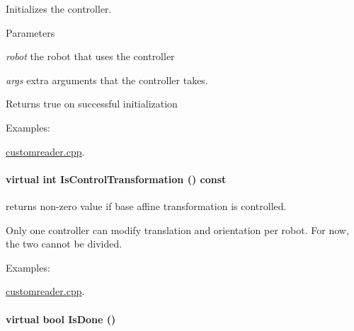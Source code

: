 Initializes the controller. 


\begin{DoxyParams}{Parameters}
\item[{\em robot}]the robot that uses the controller \item[{\em args}]extra arguments that the controller takes. \end{DoxyParams}
\begin{DoxyReturn}{Returns}
true on successful initialization 
\end{DoxyReturn}
\begin{Desc}
\item[Examples: ]\par
\hyperlink{customreader_8cpp-example}{customreader.cpp}.\end{Desc}
\hypertarget{classOpenRAVE_1_1ControllerBase_af577c7692eed532e6ed26db3dca5ef47}{
\paragraph[{IsControlTransformation}]{\setlength{\rightskip}{0pt plus 5cm}virtual int IsControlTransformation () const}\hfill}
\label{classOpenRAVE_1_1ControllerBase_af577c7692eed532e6ed26db3dca5ef47}


returns non-\/zero value if base affine transformation is controlled. 

Only one controller can modify translation and orientation per robot. For now, the two cannot be divided. \begin{Desc}
\item[Examples: ]\par
\hyperlink{customreader_8cpp-example}{customreader.cpp}.\end{Desc}
\hypertarget{classOpenRAVE_1_1ControllerBase_a2a9a4df35568126aca5e305ca35d1d31}{
\paragraph[{IsDone}]{\setlength{\rightskip}{0pt plus 5cm}virtual bool IsDone ()}\hfill}
\label{classOpenRAVE_1_1ControllerBase_a2a9a4df35568126aca5e305ca35d1d31}


